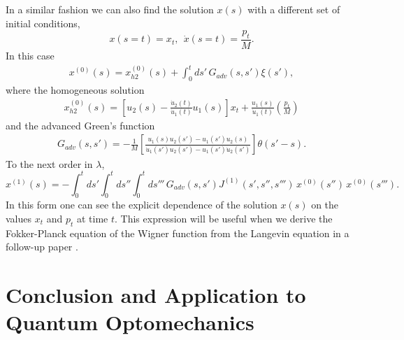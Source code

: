 \documentclass[%
amssymb,preprint,preprintnumbers,nofootinbib,superscriptaddress]{revtex4}
\begin{document}
In a similar fashion we can also find the solution $x(s)$ with a different set of initial conditions,
\begin{equation}
x(s=t)=x_{t},\ \ \dot{x}(s=t)=\frac{p_{t}}{M}.
\end{equation}
In this case 
\begin{eqnarray}
x^{(0)}(s)=x^{(0)}_{h2}(s)+\int_{0}^{t}ds'\,G_{adv}(s,s')\xi(s'),
\end{eqnarray}
where the homogeneous solution
\begin{eqnarray}
x^{(0)}_{h2}(s)=\left[u_{2}(s)-\frac{\dot{u}_{2}(t)}{\dot{u}_{1}(t)}u_{1}(s)\right]x_{t}+\frac{u_{1}(s)}{\dot{u}_{1}(t)}\left(\frac{p_{t}}{M}\right)
\end{eqnarray}
and the advanced Green's function
\begin{eqnarray}
G_{adv}(s,s')=-\frac{1}{M}\left[\frac{u_{1}(s)u_{2}(s')-u_{1}(s')u_{2}(s)}{\dot{u}_{1}(s')u_{2}(s')-u_{1}(s')\dot{u}_{2}(s')}\right]\theta(s'-s).
\end{eqnarray}
To the next order in $\lambda$,
\begin{equation}
x^{(1)}(s)=-\int_{0}^{t}ds'\int_{0}^{t}ds''\int_{0}^{t}ds'''\,G_{adv}(s,s')J^{(1)}(s',s'',s''')\,x^{(0)}(s'')\,x^{(0)}(s''').
\end{equation}
In this form one can see the explicit dependence of the solution $x(s)$ on the values $x_{t}$ and $p_{t}$ at time $t$. This expression will be useful when we derive the Fokker-Planck equation of the Wigner function from the Langevin equation in a follow-up paper \cite{ChoHuQOM}. 


%
%


%
 
%

\section{Conclusion and Application to Quantum Optomechanics}\label{sec:conclusion}
\end{document}
